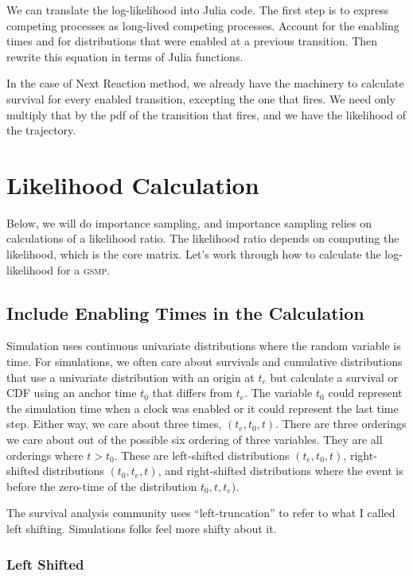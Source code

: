 \documentclass{article}
\newcommand{\gsmp}{\textsc{gsmp}\xspace}
\begin{document}
We can translate the log-likelihood into Julia code. The first step is to express competing processes as long-lived competing processes. Account for the enabling times and for distributions that were enabled at a previous transition. Then rewrite this equation in terms of Julia functions.

In the case of Next Reaction method, we already have the machinery to calculate survival for every enabled transition, excepting the one that fires. We need only multiply that by the pdf of the transition that fires, and we have the likelihood of the trajectory.

\section{Likelihood Calculation}

Below, we will do importance sampling, and importance sampling relies on calculations of a likelihood ratio. The likelihood ratio depends on computing the likelihood, which is the core matrix. Let's work through how to calculate the log-likelihood for a \gsmp.

\subsection{Include Enabling Times in the Calculation}

Simulation uses continuous univariate distributions where the random variable is time. For simulations, we often care about survivals and cumulative distributions that use a univariate distribution with an origin at $t_e$ but calculate a survival or CDF using an anchor time $t_0$ that differs from $t_e$. The variable $t_0$ could represent the simulation time when a clock was enabled or it could represent the last time step. Either way, we care about three times, $(t_e, t_0, t)$. There are three orderings we care about out of the possible six ordering of three variables. They are all orderings where $t>t_0$. These are left-shifted distributions $(t_e, t_0, t)$, right-shifted distributions $(t_0, t_e, t)$, and right-shifted distributions where the event is before the zero-time of the distribution $t_0, t, t_e)$.

The survival analysis community uses ``left-truncation'' to refer to what I called left shifting. Simulations folks feel more shifty about it.

\subsubsection{Left Shifted}
\begin{center}
\end{center}
\end{document}
